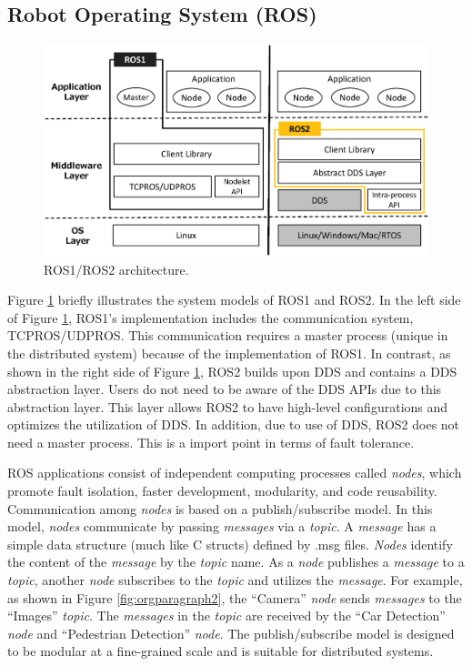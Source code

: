 \documentclass{sig-alternate-05-2015}
\begin{document}
\vspace{-1mm}
\subsection{Robot Operating System (ROS)}
\label{sec:orgheadline6}

\begin{figure}[t]
  \centering
  \includegraphics[width=0.9\linewidth]{../figure/ros_architecture.eps}
  \vspace{-5mm}
  \caption{\label{fig:orgparagraph1}
    ROS1/ROS2 architecture.}
  \vspace{-6mm}
\end{figure}   

Figure \ref{fig:orgparagraph1} briefly illustrates the system models of ROS1 and ROS2. 
In the left side of Figure \ref{fig:orgparagraph1}, ROS1's implementation includes the communication system, TCPROS/UDPROS.
This communication requires a master process (unique in the distributed system) because of the implementation of ROS1.
In contrast, as shown in the right side of Figure \ref{fig:orgparagraph1}, ROS2 builds upon DDS and contains a DDS abstraction layer. 
Users do not need to be aware of the DDS APIs due to this abstraction layer.
This layer allows ROS2 to have high-level configurations and optimizes the utilization of DDS. 
In addition, due to use of DDS, ROS2 does not need a master process.
This is a import point in terms of fault tolerance.

ROS applications consist of independent computing processes called \emph{nodes}, which promote fault isolation, faster development, modularity, and code reusability. 
Communication among \emph{nodes} is based on a publish/subscribe model. 
In this model, \emph{nodes} communicate by passing \emph{messages} via a \emph{topic}. 
A \emph{message} has a simple data structure (much like C structs) defined by .msg files.
\emph{Nodes} identify the content of the \emph{message} by the \emph{topic} name.
As a \emph{node} publishes a \emph{message} to a \emph{topic}, another \emph{node} subscribes to the \emph{topic} and utilizes the \emph{message}. 
For example, as shown in Figure \ref{fig:orgparagraph2}, the ``Camera'' \emph{node} sends \emph{messages} to the ``Images'' \emph{topic}. 
The \emph{messages} in the \emph{topic} are received by the ``Car Detection'' \emph{node}  and ``Pedestrian Detection'' \emph{node}.
The publish/subscribe model is designed to be modular at a fine-grained scale and is suitable for distributed systems.
\end{document}
